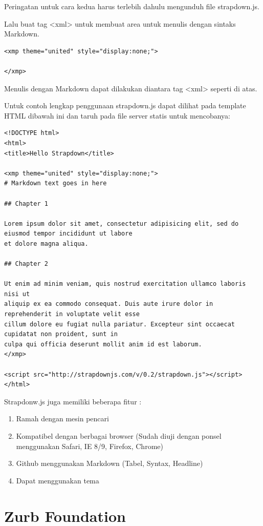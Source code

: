 \begin{enumerate}
Peringatan untuk cara kedua harus terlebih dahulu mengunduh file strapdown.js.

Lalu buat tag <xml> untuk membuat area untuk menulis dengan sintaks Markdown.
\begin{lstlisting}
<xmp theme="united" style="display:none;">

</xmp>
\end{lstlisting}
Menulis dengan Markdown dapat dilakukan diantara  tag <xml> seperti di atas.

Untuk contoh lengkap penggunaan strapdown.js dapat dilihat pada template HTML dibawah ini dan taruh pada file server statis untuk mencobanya:
\begin{lstlisting}
<!DOCTYPE html>
<html>
<title>Hello Strapdown</title>

<xmp theme="united" style="display:none;">
# Markdown text goes in here

## Chapter 1

Lorem ipsum dolor sit amet, consectetur adipisicing elit, sed do eiusmod tempor incididunt ut labore
et dolore magna aliqua. 

## Chapter 2

Ut enim ad minim veniam, quis nostrud exercitation ullamco laboris nisi ut
aliquip ex ea commodo consequat. Duis aute irure dolor in reprehenderit in voluptate velit esse
cillum dolore eu fugiat nulla pariatur. Excepteur sint occaecat cupidatat non proident, sunt in
culpa qui officia deserunt mollit anim id est laborum.
</xmp>

<script src="http://strapdownjs.com/v/0.2/strapdown.js"></script>
</html>
\end{lstlisting}

Strapdonw.js juga memiliki beberapa fitur :
\begin{enumerate}
\item Ramah dengan mesin pencari
\item Kompatibel dengan berbagai browser (Sudah diuji dengan ponsel menggunakan Safari, IE 8/9, Firefox, Chrome)
\item Github menggunakan Markdown (Tabel, Syntax, Headline)
\item Dapat menggunakan tema
\end{enumerate}

\section{Zurb Foundation \cite{Zurb:2015}}
\label{sec:zurbfoundation}


\end{enumerate}
